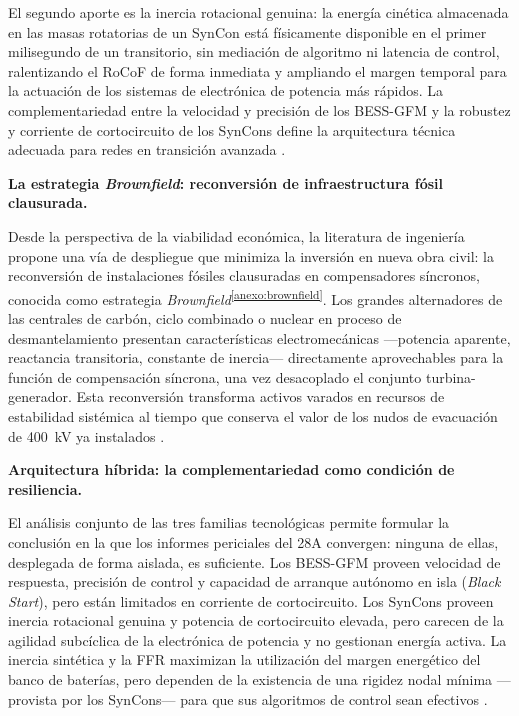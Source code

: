 El segundo aporte es la inercia rotacional genuina: la energía cinética
almacenada en las masas rotatorias de un SynCon está físicamente
disponible en el primer milisegundo de un transitorio, sin mediación de
algoritmo ni latencia de control, ralentizando el RoCoF de forma
inmediata y ampliando el margen temporal para la actuación de los sistemas
de electrónica de potencia más rápidos. La complementariedad entre la
velocidad y precisión de los BESS-GFM y la robustez y corriente de
cortocircuito de los SynCons define la arquitectura técnica adecuada para
redes en transición avanzada \cite{futured2024}.

\vspace{0.4cm}
\noindent\textbf{La estrategia \textit{Brownfield}: reconversión de
infraestructura fósil clausurada.}

Desde la perspectiva de la viabilidad económica, la literatura de
ingeniería propone una vía de despliegue que minimiza la inversión en
nueva obra civil: la reconversión de instalaciones fósiles clausuradas
en compensadores síncronos, conocida como estrategia
\textit{Brownfield}\textsuperscript{\ref{anexo:brownfield}}. Los grandes
alternadores de las centrales de carbón, ciclo combinado o nuclear en
proceso de desmantelamiento presentan características electromecánicas
---potencia aparente, reactancia transitoria, constante de inercia---
directamente aprovechables para la función de compensación síncrona,
una vez desacoplado el conjunto turbina-generador. Esta reconversión
transforma activos varados en recursos de estabilidad sistémica al tiempo
que conserva el valor de los nudos de evacuación de 400~kV ya instalados
\cite{futured2024,gobierno2025}.

\vspace{0.4cm}
\noindent\textbf{Arquitectura híbrida: la complementariedad como
condición de resiliencia.}

El análisis conjunto de las tres familias tecnológicas permite formular
la conclusión en la que los informes periciales del 28A convergen:
ninguna de ellas, desplegada de forma aislada, es suficiente. Los
BESS-GFM proveen velocidad de respuesta, precisión de control y
capacidad de arranque autónomo en isla (\textit{Black Start}), pero
están limitados en corriente de cortocircuito. Los SynCons proveen
inercia rotacional genuina y potencia de cortocircuito elevada, pero
carecen de la agilidad subcíclica de la electrónica de potencia y no
gestionan energía activa. La inercia sintética y la FFR maximizan la
utilización del margen energético del banco de baterías, pero dependen
de la existencia de una rigidez nodal mínima ---provista por los
SynCons--- para que sus algoritmos de control sean efectivos
\cite{futured2024,nrel2025}.

